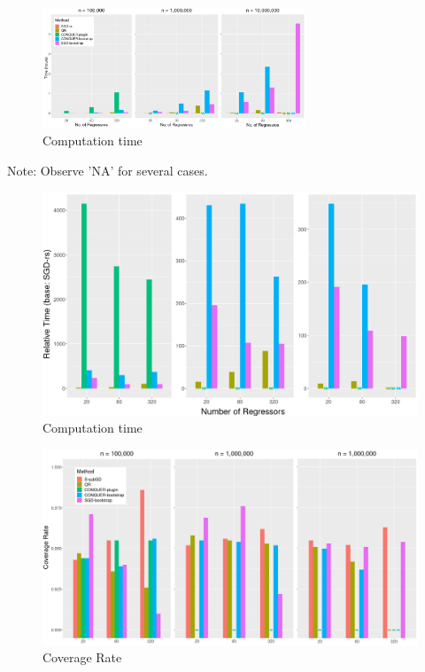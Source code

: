 \documentclass[beamer, t]{beamer}
\begin{document}
\begin{frame}
	\begin{figure}[!htbp]
		\caption{Computation time} \label{fig:time}
		\centering
		\vskip10pt
		\includegraphics[width=0.7\textwidth]{figures/fig_time.png}
	\end{figure}

Note: Observe 'NA' for several cases.
	
\end{frame}
\begin{frame}
	\begin{figure}[!htbp]
		\caption{Computation time} \label{fig:time}
		\centering
		\vskip10pt
		\includegraphics[width=\textwidth]{figures/fig_rel_time.png}
	\end{figure}
	
\end{frame}

\begin{frame}
	
	\begin{figure}[!htbp]
		\caption{Coverage Rate} \label{fig:ci}
		\centering
		\vskip10pt
		\includegraphics[width=\textwidth]{figures/fig_coverage.png}
	\end{figure}
	
\end{frame}
\end{document}
